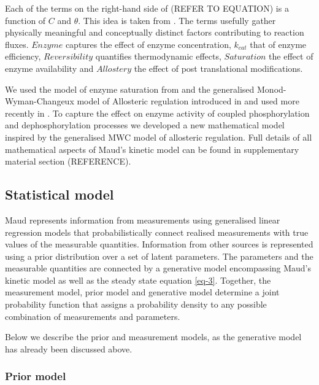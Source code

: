 \documentclass[journal=,manuscript=]{achemso}
\begin{document}
Each of the terms on the right-hand side of (REFER TO EQUATION) is a
function of \(C\) and \(\theta\). This idea is taken from
\citet{noor_note_2013}. The terms usefully gather physically meaningful
and conceptually distinct factors contributing to reaction fluxes.
\(Enzyme\) captures the effect of enzyme concentration, \(k_{cat}\) that
of enzyme efficiency, \(Reversibility\) quantifies thermodynamic
effects, \(Saturation\) the effect of enzyme availability and
\(Allostery\) the effect of post translational modifications.

We used the model of enzyme saturation from
\citet{liebermeister_modular_2010} and the generalised
Monod-Wyman-Changeux model of Allosteric regulation introduced in
\citep{monod_nature_1965, changeux_2013, popova_generalization_1975, popova_description_1979}
and used more recently in \citet{matosGRASPComputationalPlatform2022}.
To capture the effect on enzyme activity of coupled phosphorylation and
dephosphorylation processes we developed a new mathematical model
inspired by the generalised MWC model of allosteric regulation. Full
details of all mathematical aspects of Maud's kinetic model can be found
in supplementary material section (REFERENCE).

\hypertarget{statistical-model}{%
\subsection{Statistical model}\label{statistical-model}}

Maud represents information from measurements using generalised linear
regression models that probabilistically connect realised measurements
with true values of the measurable quantities. Information from other
sources is represented using a prior distribution over a set of latent
parameters. The parameters and the measurable quantities are connected
by a generative model encompassing Maud's kinetic model as well as the
steady state equation \eqref{eq-3}. Together, the measurement model,
prior model and generative model determine a joint probability function
that assigns a probability density to any possible combination of
measurements and parameters.

Below we describe the prior and measurement models, as the generative
model has already been discussed above.

\hypertarget{prior-model}{%
\subsubsection{Prior model}\label{prior-model}}
\end{document}
